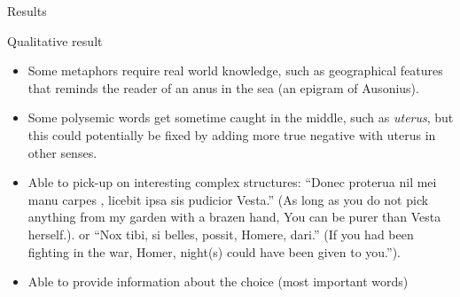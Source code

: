 \documentclass[aspectratio=169]{beamer}
\begin{document}
\begin{frame}{Results}
    \begin{table}[ht]
    \resizebox{\linewidth}{!}{%
    \begin{tabular}{llllll}
    \hline
    {} & & TPR & TNR &   Precision &          F1 \\
    Embedding & Model             &                   &                   &             &             \\ \hline
     & Baseline 1 & 100.0 & 7.43 & 9.82 & 17.88  \\
     & Baseline 2 & 100.0 & 12.32 & 10.31 & 18.69  \\
     & Baseline 3 & 98.8 & 48.37 & 16.17 & 27.79  \\
     & Baseline 4 & 74.9 & 72.34 & 21.44 & 33.34  \\
    \hline
    Lemma & GRU-256           &        65.78 ± 5.82 &        \textbf{98.92 ± 0.64} &  \textbf{86.65 ± 5.13} &  74.45 ± 2.59 \\
    Lemma & HAN-256           &        \textbf{70.60 ± 2.83} &        98.76 ± 0.30 &  85.33 ± 2.75 &  \textbf{77.20 ± 1.35} \\
    Token & HAN-128           &        57.81 ± 5.37 &        98.82 ± 0.42 &  83.51 ± 3.79 &  68.06 ± 3.11 \\
    Token & GRU-128           &        59.16 ± 5.37 &        98.74 ± 0.35 &  82.81 ± 3.37 &  68.81 ± 3.16 \\
    Token & LSTM-128          &        57.01 ± 3.11 &        98.76 ± 0.26 &  82.33 ± 2.52 &  67.29 ± 1.84 \\
    \hline
    \end{tabular}
    }
    \caption{Median scores over 10 trained models for each model per embedding and encoder. ``Lemma'' or ``token'' stand for the concatenation of word level embedding and character level embeddings of the given input.}
    \label{tab:main-scores}
    \end{table}
\end{frame}

\begin{frame}{Qualitative result}
    \begin{itemize}
        \item Some metaphors require real world knowledge, such as geographical features that reminds the reader of an anus in the sea (an epigram of Ausonius).
        \item Some polysemic words get sometime caught in the middle, such as \textit{uterus}, but this could potentially be fixed by adding more true negative with uterus in other senses.
        \item Able to pick-up on interesting complex structures: ``Donec proterua nil mei manu carpes ,
licebit ipsa sis pudicior Vesta.'' (As long as you do not pick anything from my garden with a brazen hand, You can be purer than Vesta herself.). or  ``Nox tibi, si belles, possit, Homere, dari.'' (If you had been fighting in the war, Homer, night(s) could have been given to you.'').
        \item Able to provide information about the choice (most important words)
    \end{itemize}
\end{frame}
\end{document}
